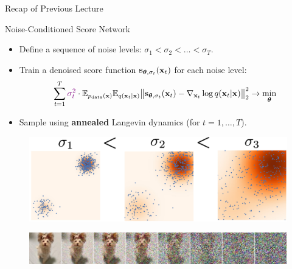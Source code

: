 \documentclass{beamer}
\begin{document}
\begin{frame}{Recap of Previous Lecture}
    \begin{block}{Noise-Conditioned Score Network}
        \begin{itemize}
            \item Define a sequence of noise levels: $\sigma_1 < \sigma_2 < \dots < \sigma_T$.
            \item Train a denoised score function $\mathbf{s}_{\boldsymbol{\theta}, \sigma_t}(\mathbf{x}_t)$ for each noise level:
            \vspace{-0.3cm}
            \[
                \sum_{t=1}^T {\color{violet}\sigma_t^2} \cdot \mathbb{E}_{p_{\text{data}}(\mathbf{x})} \mathbb{E}_{q(\mathbf{x}_t | \mathbf{x})}\bigl\| \mathbf{s}_{\boldsymbol{\theta}, \sigma_t}(\mathbf{x}_t) - \nabla_{\mathbf{x}_t} \log q(\mathbf{x}_t | \mathbf{x}) \bigr\|^2_2 \rightarrow \min_{\boldsymbol{\theta}}
            \]
            \vspace{-0.5cm}
            \item Sample using \textbf{annealed} Langevin dynamics (for $t=1, \dots, T$).
        \end{itemize}
    \end{block}
    \vspace{-0.3cm}
    \begin{figure}
        \includegraphics[width=0.55\linewidth]{figs/multi_scale}
    \end{figure}
    \vspace{-0.3cm}
    \begin{figure}
        \includegraphics[width=\linewidth]{figs/duoduo}
    \end{figure}
\end{frame}
\end{document}
